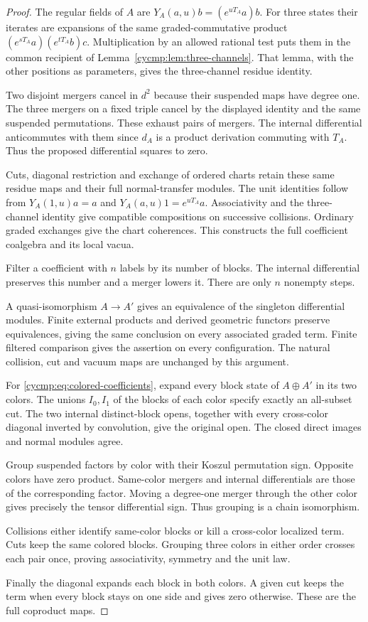 \begin{proof}
The regular fields of $A$ are $Y_A(a,u)b=(e^{uT_A}a)b$.
For three states their iterates are expansions of the same
graded-commutative product
$(e^{sT_A}a)(e^{tT_A}b)c$. Multiplication by an allowed rational
test puts them in the common recipient of
Lemma~\ref{cycmp:lem:three-channels}. That lemma, with the other
positions as parameters, gives the three-channel residue identity.

Two disjoint mergers cancel in $d^2$ because their suspended maps
have degree one. The three mergers on a fixed triple cancel by
the displayed identity and the same suspended permutations. These
exhaust pairs of mergers. The internal differential anticommutes
with them since $d_A$ is a product derivation commuting with $T_A$.
Thus the proposed differential squares to zero.

Cuts, diagonal restriction and exchange of ordered charts retain
these same residue maps and their full normal-transfer modules.
The unit identities follow from $Y_A(1,u)a=a$ and
$Y_A(a,u)1=e^{uT_A}a$. Associativity and the three-channel identity
give compatible compositions on successive collisions. Ordinary
graded exchanges give the chart coherences. This constructs the
full coefficient coalgebra and its local vacua.

Filter a coefficient with $n$ labels by its number of blocks.
The internal differential preserves this number and a merger lowers
it. There are only $n$ nonempty steps.

A quasi-isomorphism $A\to A'$
gives an equivalence of the singleton differential modules.
Finite external products and derived geometric functors preserve
equivalences, giving the same conclusion on every associated graded term.
Finite filtered comparison gives the assertion on every configuration. The natural
collision, cut and vacuum maps are unchanged by this argument.

For \eqref{cycmp:eq:colored-coefficients}, expand every block state
of $A\oplus A'$ in its two colors. The unions $I_0,I_1$ of the
blocks of each color specify exactly an all-subset cut. The two
internal distinct-block opens, together with every cross-color
diagonal inverted by convolution, give the original open. The
closed direct images and normal modules agree.

Group suspended factors by color with their Koszul permutation sign.
Opposite colors have zero product. Same-color mergers and internal
differentials are those of the corresponding factor. Moving a
degree-one merger through the other color gives precisely the tensor
differential sign. Thus grouping is a chain isomorphism.

Collisions
either identify same-color blocks or kill a cross-color localized
term. Cuts keep the same colored blocks. Grouping three colors in
either order crosses each pair once, proving associativity, symmetry
and the unit law.

Finally the diagonal expands each block in both
colors. A given cut keeps the term when every block stays on one
side and gives zero otherwise. These are the full coproduct maps.
\end{proof}

